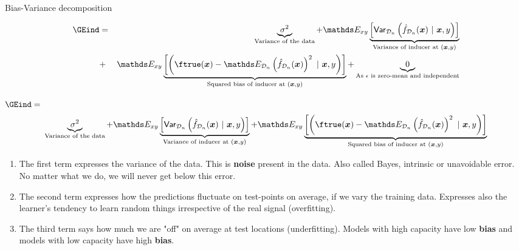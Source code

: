 \begin{vbframe} {Bias-Variance decomposition}
\begin{footnotesize}
\begin{eqnarray*}
\GEind 
  &=& \underbrace{\sigma^2}_{\text{Variance of the data}} + \E_{xy}\underbrace{\left[\var_{\D_n}\left(\fh_{\D_n}(\xv) ~|~\xv, y\right)\right]}_{\text{Variance of inducer at } (\xv, y)} \\ &+& \E_{xy}\underbrace{\left[\left(\ftrue(\xv)-\E_{\D_n}\left(\fh_{\D_n}(\xv)\right)^2~|~\xv, y\right)\right]}_{\text{Squared bias of inducer at } (\xv, y)} + \underbrace{0}_{\text{As $\epsilon$ is zero-mean and independent}}
\end{eqnarray*}
\end{footnotesize}


\framebreak 

\begin{footnotesize}
$\GEind =$  
$$
 \underbrace{\sigma^2}_{\text{Variance of the data}} + \E_{xy}\underbrace{\left[\var_{\D_n}\left(\fh_{\D_n}(\xv) ~|~\xv, y\right)\right]}_{\text{Variance of inducer at } (\xv, y)} + \E_{xy}\underbrace{\left[\left(\ftrue(\xv)-\E_{\D_n}\left(\fh_{\D_n}(\xv)\right)^2~|~\xv, y\right)\right]}_{\text{Squared bias of inducer at } (\xv, y)}  
$$
\end{footnotesize}
\begin{enumerate}
  \item The first term expresses the variance of the data. 
    This is \textbf{noise} present in the data.
    Also called Bayes, intrinsic or unavoidable error.
    No matter what we do, we will never get below this error.
  \item The second term expresses how the predictions fluctuate on test-points on average, if we vary the training data. Expresses also the learner's tendency to learn random things irrespective of the real signal (overfitting).
  \item The third term says how much we are "off" on average at test locations (underfitting).
    Models with high capacity have low \textbf{bias} and models with low capacity have high \textbf{bias}.
\end{enumerate}



\end{vbframe}
